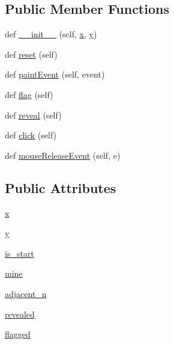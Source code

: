 \subsection*{Public Member Functions}
\begin{DoxyCompactItemize}
\item 
def \mbox{\hyperlink{classtile_1_1_tile_a4f02fc7ff22b66bbf6d4660eab79ad8a}{\+\_\+\+\_\+init\+\_\+\+\_\+}} (self, \mbox{\hyperlink{classtile_1_1_tile_a3d5f111dcaf01ba902df52f85ee50318}{x}}, \mbox{\hyperlink{classtile_1_1_tile_aea02ac6a7bbed9aacf20d5db108f3006}{y}})
\item 
def \mbox{\hyperlink{classtile_1_1_tile_aace6248933849675e14c829240fcc4c2}{reset}} (self)
\item 
def \mbox{\hyperlink{classtile_1_1_tile_af14e5b7f51340e91c603bc032c43d8d5}{paint\+Event}} (self, event)
\item 
def \mbox{\hyperlink{classtile_1_1_tile_a54edcdbf94da0c1d8dab7686fdce8a69}{flag}} (self)
\item 
def \mbox{\hyperlink{classtile_1_1_tile_a446f045f44718e6837abae8d0622c8ca}{reveal}} (self)
\item 
def \mbox{\hyperlink{classtile_1_1_tile_a024a479a7f7a0b8b4cc9c77f913bb6e3}{click}} (self)
\item 
def \mbox{\hyperlink{classtile_1_1_tile_a0441823c54ba6bbd8c29d9d61ff8161b}{mouse\+Release\+Event}} (self, e)
\end{DoxyCompactItemize}
\subsection*{Public Attributes}
\begin{DoxyCompactItemize}
\item 
\mbox{\hyperlink{classtile_1_1_tile_a3d5f111dcaf01ba902df52f85ee50318}{x}}
\item 
\mbox{\hyperlink{classtile_1_1_tile_aea02ac6a7bbed9aacf20d5db108f3006}{y}}
\item 
\mbox{\hyperlink{classtile_1_1_tile_ab4f8de0b5af2f9a0b27224d725e8b5a7}{is\+\_\+start}}
\item 
\mbox{\hyperlink{classtile_1_1_tile_ab29c964ec3ffe2e99aa557bb8d3a9982}{mine}}
\item 
\mbox{\hyperlink{classtile_1_1_tile_a5f38c273f7d60000a57a75be5021e111}{adjacent\+\_\+n}}
\item 
\mbox{\hyperlink{classtile_1_1_tile_a5757ce164d1a98a1a001e81d78243356}{revealed}}
\item 
\mbox{\hyperlink{classtile_1_1_tile_aa67ee8ccb2215eae98063593792e341c}{flagged}}
\end{DoxyCompactItemize}

